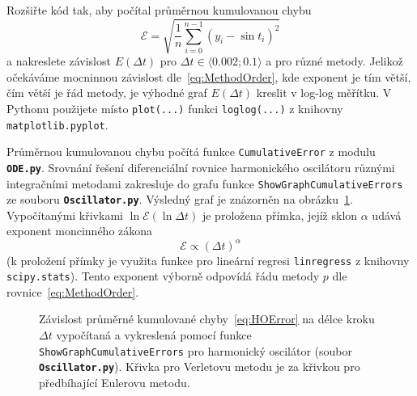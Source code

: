 \documentclass[a4paper,11pt,twoside]{article}
\def\code#1{\textnormal{\texttt{#1}}}
\def\file#1{\textnormal{\textbf{\texttt{#1}}}}
\begin{document}
    \begin{task}
        Rozšiřte kód tak, aby počítal průměrnou kumulovanou chybu
        \begin{equation}\label{eq:HOError}
            \mathcal{E}=\sqrt{\frac{1}{n}\sum_{i=0}^{n-1}\left(y_{i}-\sin t_{i}\right)^{2}}
        \end{equation}
        a nakreslete závislost $E(\Delta t)$ pro $\Delta t\in\langle0.002;0.1\rangle$ a pro různé metody.
        Jelikož očekáváme mocninnou závislost dle~\eqref{eq:MethodOrder}, kde exponent je tím větší, čím větší je řád metody, je výhodné graf $E(\Delta t)$ kreslit v log-log měřítku.
        V Pythonu použijete místo \textnormal{\texttt{plot(...)}} funkci \textnormal{\texttt{loglog(...)}} z knihovny \textnormal{\texttt{matplotlib.pyplot}}.
    \end{task}

    \begin{solution}
        Průměrnou kumulovanou chybu počítá funkce \code{CumulativeError} z modulu \file{ODE.py}.
        Srovnání řešení diferenciální rovnice harmonického oscilátoru různými integračními metodami zakresluje do grafu funkce \code{ShowGraphCumulativeErrors} ze souboru \file{Oscillator.py}.
        Výsledný graf je znázorněn na obrázku~\ref{fig:HOError}.
        Vypočítanými křivkami $\ln\mathcal{E}(\ln\Delta t)$ je proložena přímka, jejíž sklon $\alpha$ udává exponent moncinného zákona
        \begin{equation}
            \mathcal{E}\propto\left(\Delta t\right)^{\alpha}
        \end{equation} 
        (k proložení přímky je využita funkce pro lineární regresi \code{linregress} z knihovny \code{scipy.stats}).
        Tento exponent výborně odpovídá řádu metody $p$ dle rovnice~\eqref{eq:MethodOrder}.

        \begin{figure}[!htbp]
            \centering
			\caption{
                \protect\small
                Závislost průměrné kumulované chyby~\eqref{eq:HOError} na délce kroku $\Delta t$ vypočítaná a vykreslená pomocí funkce \code{ShowGraphCumulativeErrors} pro harmonický oscilátor (soubor \file{Oscillator.py}).
                Křivka pro Verletovu metodu je  za křivkou pro předbíhající Eulerovu metodu.
            }	
            \label{fig:HOError}
		\end{figure}
    \end{solution}
\end{document}
